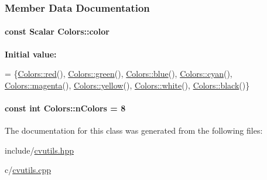 \subsubsection{Member Data Documentation}
\hypertarget{classColors_aa4ba92c3d309c4f93bf10cc0fe2e2d3b}{
\paragraph[{color}]{\setlength{\rightskip}{0pt plus 5cm}const Scalar Colors\-::color\hspace{0.3cm}{\ttfamily [static]}}}\label{classColors_aa4ba92c3d309c4f93bf10cc0fe2e2d3b}
{\bfseries Initial value\-:}
\begin{DoxyCode}
= \{\hyperlink{classColors_ac9355f317c0aca8cb6c1329c996b52ff}{Colors::red}(),
                                \hyperlink{classColors_a2e5a3b8a640c9a9d986a6f9edc60e14e}{Colors::green}(),
                                \hyperlink{classColors_a35176ed2a7964fd7ccac8e4bb61c1a59}{Colors::blue}(),
                                \hyperlink{classColors_aaeddb3283139623d18df416ec5cb7d4f}{Colors::cyan}(), 
                                \hyperlink{classColors_acac58cf111796f98f7f851ec8dac3c56}{Colors::magenta}(), 
                                \hyperlink{classColors_a803953241028654107321e46d9ae78d5}{Colors::yellow}(), 
                                \hyperlink{classColors_ad923407109a41ab191b3c70756868245}{Colors::white}(), 
                                \hyperlink{classColors_aec5500a7bacaf540790954b251cb859e}{Colors::black}()\}
\end{DoxyCode}
\hypertarget{classColors_a5175069a56ae9ccfcb35b1688e1926ad}{
\paragraph[{n\-Colors}]{\setlength{\rightskip}{0pt plus 5cm}const int Colors\-::n\-Colors = 8\hspace{0.3cm}{\ttfamily [static]}}}\label{classColors_a5175069a56ae9ccfcb35b1688e1926ad}


The documentation for this class was generated from the following files\-:\begin{DoxyCompactItemize}
\item 
include/\hyperlink{cvutils_8hpp}{cvutils.\-hpp}\item 
c/\hyperlink{cvutils_8cpp}{cvutils.\-cpp}\end{DoxyCompactItemize}
